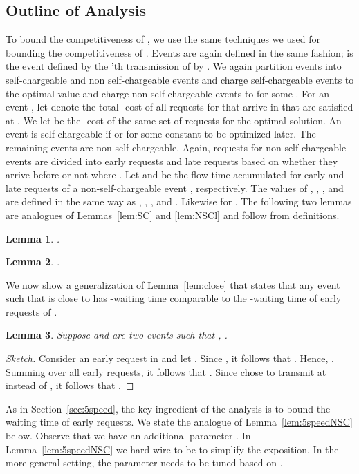\documentclass[11pt]{article}
\newtheorem{lemma}{Lemma}[section]
\begin{document}
\begin{titlepage}
\subsection{Outline of Analysis} \vspace{-2mm}
\label{sec:gen-framework} To bound the competitiveness of , we use the same techniques we used for bounding
the competitiveness of . Events are again defined in the same fashion;  is the event defined by the
'th transmission of  by . We again partition events into self-chargeable and non self-chargeable events
and charge self-chargeable events to the optimal value and charge non-self-chargeable events to  for some . For an event , let  denote the total -cost of all requests for  that arrive in  that are
satisfied at . We let  be the -cost of the same set of requests for the optimal solution. An
event  is self-chargeable if  or  for some constant
 to be optimized later. The remaining events are non self-chargeable.  Again, requests for non-self-chargeable
events are divided into early requests and late requests based on whether they arrive before  or not where
.  Let  and  be the flow time accumulated for early and
late requests of a non-self-chargeable event , respectively.  The values of , ,
, and  are defined in the same way as , , , and
. Likewise for .  The following two lemmas are analogues of Lemmas~\ref{lem:SC} and \ref{lem:NSCl}
and follow from definitions.

\begin{lemma} \label{lem:GSC}
  .
\end{lemma}



\begin{lemma}
  \label{lem:GNSCl}
  .
\end{lemma}


We now show a generalization of Lemma~\ref{lem:close} that states that
any event  such that  is close to  has
-waiting time comparable to the -waiting time of early requests of
.

\begin{lemma}
\label{lem:rq_close} Suppose  and  are two events
  such that , .
\end{lemma}
\begin{proof}[Sketch]
  Consider an early request  in  and let .  Since
  , it follows that . Hence, . Summing over all early requests, it follows that
  . Since  chose
  to transmit  at  instead of , it follows that
  .
\end{proof}

As in Section~\ref{sec:5speed}, the key ingredient of the analysis is
to bound the waiting time of early requests. We state the analogue of
Lemma~\ref{lem:5speedNSC} below. Observe that we have an additional
parameter . In Lemma~\ref{lem:5speedNSC} we hard wire  to
be  to simplify the exposition. In the more general setting, the
parameter  needs to be tuned based on .


\end{titlepage}
\end{document}
